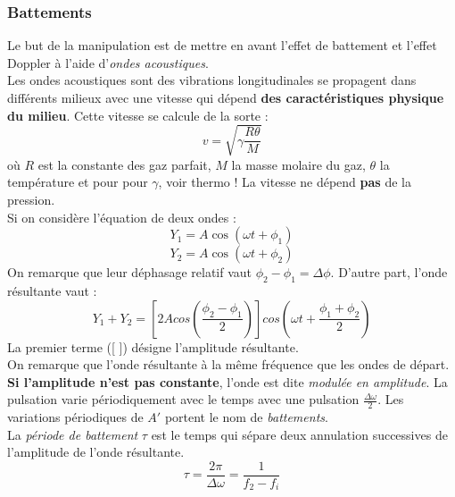 \documentclass	[11pt, a4paper, openany]{book}
\begin{document}
\subsubsection*{Battements}
Le but de la manipulation est de mettre en avant l'effet de battement et l'effet Doppler à l'aide d'\textit{ondes acoustiques}.\\
Les ondes acoustiques sont des vibrations longitudinales se propagent dans différents milieux avec une vitesse qui dépend \textbf{des caractéristiques physique du milieu}. Cette vitesse se calcule de la sorte : 
\begin{equation}
v = \sqrt{\gamma\frac{R\theta}{M}}
\label{vitesse}
\end{equation}
où $R$ est la constante des gaz parfait, $M$ la masse molaire du gaz, $\theta$ la température et pour pour $\gamma$, voir thermo ! La vitesse ne dépend \textbf{pas} de la pression.\\

Si on considère l'équation de deux ondes :
\begin{equation}
Y_1 = A\cos(\omega t + \phi_1)
\label{y1}
\end{equation}
\begin{equation}
Y_2 = A\cos(\omega t + \phi_2)
\label{y2}
\end{equation}
On remarque que leur déphasage relatif vaut $\phi_2 - \phi_1 = \Delta \phi$. D'autre part, l'onde résultante vaut :
\begin{equation}
Y_1 + Y_2 = \left[2Acos\left(\frac{\phi_2 - \phi_1}{2}\right)\right]cos\left(\omega t + \frac{\phi_1 + \phi_2}{2}\right)
\label{y1+y2}
\end{equation}
La premier terme ([ ]) désigne l'amplitude résultante. \\
On remarque que l'onde résultante à la même fréquence que les ondes de départ.\\

\textbf{Si l'amplitude n'est pas constante}, l'onde est dite \textit{modulée en amplitude}. La pulsation varie périodiquement avec le temps avec une pulsation $\frac{\Delta\omega}{2}$. Les variations périodiques de $A'$ portent le nom de \textit{battements}. \\
La \textit{période de battement} $\tau$ est le temps qui sépare deux annulation successives de l'amplitude de l'onde résultante.
\begin{equation}
\tau = \frac{2\pi}{\Delta\omega} = \frac{1}{f_2 - f_i}
\label{tau}
\end{equation}
\end{document}
